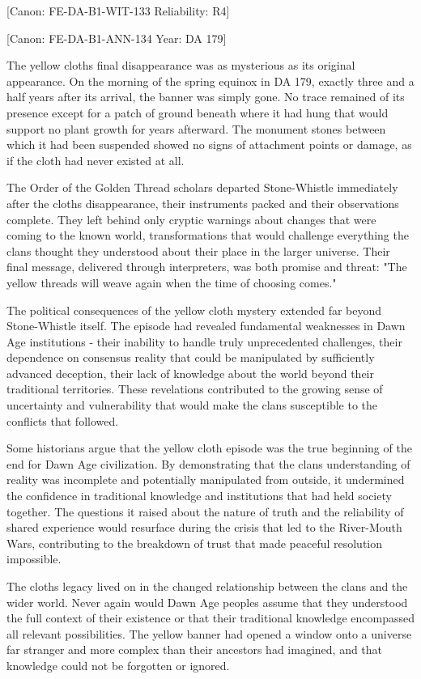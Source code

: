 {[}Canon: FE-DA-B1-WIT-133 \textbar{} Reliability: R4{]}

{[}Canon: FE-DA-B1-ANN-134 \textbar{} Year: DA 179{]}

The yellow cloth\textquotesingle s final disappearance was as mysterious
as its original appearance. On the morning of the spring equinox in DA
179, exactly three and a half years after its arrival, the banner was
simply gone. No trace remained of its presence except for a patch of
ground beneath where it had hung that would support no plant growth for
years afterward. The monument stones between which it had been suspended
showed no signs of attachment points or damage, as if the cloth had
never existed at all.

The Order of the Golden Thread scholars departed Stone-Whistle
immediately after the cloth\textquotesingle s disappearance, their
instruments packed and their observations complete. They left behind
only cryptic warnings about changes that were coming to the known world,
transformations that would challenge everything the clans thought they
understood about their place in the larger universe. Their final
message, delivered through interpreters, was both promise and threat:
"The yellow threads will weave again when the time of choosing comes."

The political consequences of the yellow cloth mystery extended far
beyond Stone-Whistle itself. The episode had revealed fundamental
weaknesses in Dawn Age institutions - their inability to handle truly
unprecedented challenges, their dependence on consensus reality that
could be manipulated by sufficiently advanced deception, their lack of
knowledge about the world beyond their traditional territories. These
revelations contributed to the growing sense of uncertainty and
vulnerability that would make the clans susceptible to the conflicts
that followed.

Some historians argue that the yellow cloth episode was the true
beginning of the end for Dawn Age civilization. By demonstrating that
the clans\textquotesingle{} understanding of reality was incomplete and
potentially manipulated from outside, it undermined the confidence in
traditional knowledge and institutions that had held society together.
The questions it raised about the nature of truth and the reliability of
shared experience would resurface during the crisis that led to the
River-Mouth Wars, contributing to the breakdown of trust that made
peaceful resolution impossible.

The cloth\textquotesingle s legacy lived on in the changed relationship
between the clans and the wider world. Never again would Dawn Age
peoples assume that they understood the full context of their existence
or that their traditional knowledge encompassed all relevant
possibilities. The yellow banner had opened a window onto a universe far
stranger and more complex than their ancestors had imagined, and that
knowledge could not be forgotten or ignored.

